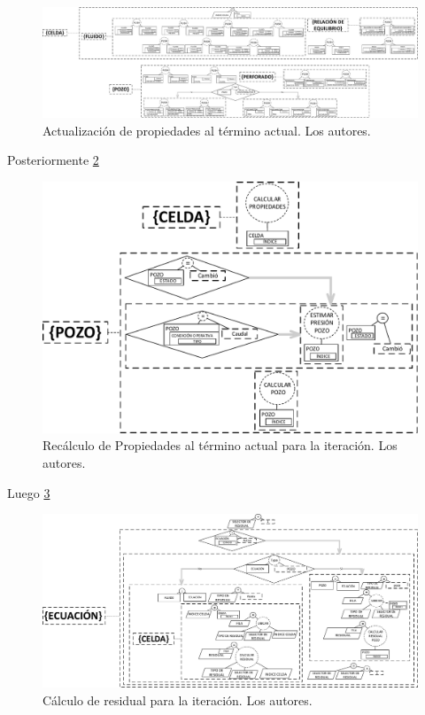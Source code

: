 \begin{figure}[h]
	\centering%
	\includegraphics[width=\linewidth]{Fig/ActualizacionDeVariables.pdf}%
	\caption{Actualización de propiedades al término actual. Los autores.} \label{fig:UpdateProperties}
\end{figure}
Posteriormente \ref{fig:TimeK}\\%
\begin{figure}[h]
	\centering%
	\includegraphics[width=\linewidth]{Fig/TiempoK.pdf}%
	\caption{Recálculo de Propiedades al término actual para la iteración. Los autores.} \label{fig:TimeK}
\end{figure}

Luego \ref{fig:Residual} \\ %

\begin{figure}[h]
	\centering%
	\includegraphics[width=\linewidth]{Fig/Residual.pdf}%
	\caption{Cálculo de residual para la iteración. Los autores.} \label{fig:Residual}
\end{figure}


